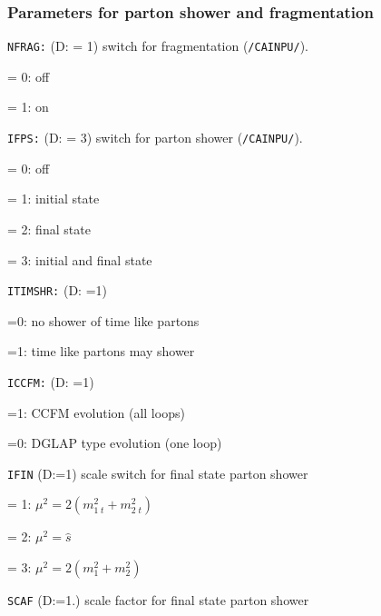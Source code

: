 \documentclass[11pt]{article} \usepackage{mystyle-new}
\newcommand{\deflab}[1]{#1\hfil}%
\newenvironment{defl}[1]%
  {\begin{list}{}{\settowidth{\labelwidth}{#1}%
  \setlength{\leftmargin}{\labelwidth}%
  \addtolength{\leftmargin}{\labelsep}%
  \setlength{\itemsep}{0pt plus 1pt}
  \setlength{\parsep}{0pt plus 1pt}
  \setlength{\topsep}{0pt plus 1pt}
  \setlength{\partopsep}{0pt plus 1pt}
  \setlength{\parskip}{2mm plus 1mm minus 1mm}
  \let\makelabel\deflab}}%
  {\end{list}}
\begin{document}
\subsubsection{Parameters for parton shower and fragmentation}
\begin{defl}{123456789012345}
\item[{\tt NFRAG:}]  (D: = 1)
                        switch for fragmentation ({\tt /CAINPU/}).
\item[] = 0: off
\item[] = 1: on 
\item[{\tt IFPS:}]  (D: = 3)
                  switch for parton shower ({\tt /CAINPU/}).
\item[] = 0: off
\item[] = 1: initial state
\item[] = 2: final state
\item[] = 3: initial and final state  
\item[{\tt ITIMSHR:}]  (D: =1)
\item[] =0: no shower of time like partons
\item[] =1: time like partons may shower
\item[{\tt ICCFM:}]  (D: =1)
\item[] =1: CCFM evolution (all loops)
\item[] =0: DGLAP type evolution (one loop)
\item[{\tt IFIN}]  (D:=1)  scale switch for  final state parton shower
\item[] = 1: $\mu^2=2 (m^2_{1\;t} + m^2_{2\;t})$
\item[] = 2: $\mu^2=\hat{s}$
\item[] = 3:  $\mu^2=2 (m^2_{1} + m^2_{2})$
\item[{\tt SCAF}] (D:=1.) scale factor for final state parton shower
\end{defl}
\end{document}
